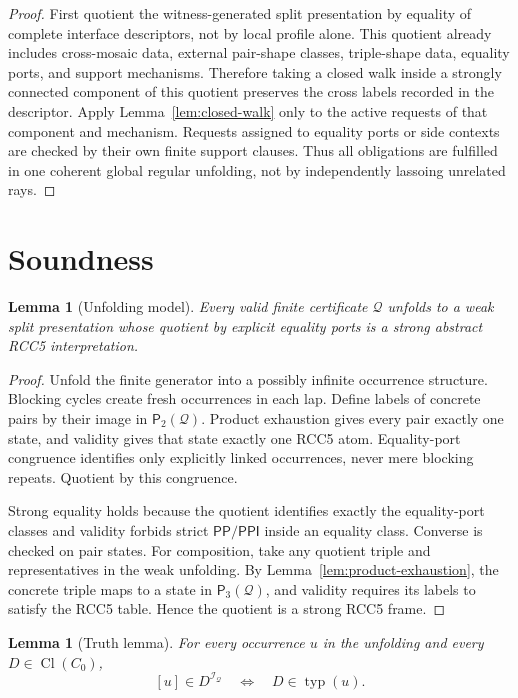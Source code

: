 \documentclass[11pt]{article}
\newtheorem{lemma}[theorem]{Lemma}
\newcommand{\PP}{\mathsf{PP}}
\newcommand{\PPI}{\mathsf{PPI}}
\newcommand{\Cl}{\operatorname{Cl}}
\newcommand{\I}{\mathcal I}
\newcommand{\Q}{\mathcal Q}
\newcommand{\typ}{\operatorname{typ}}
\newcommand{\Pairs}{\mathsf P_2}
\newcommand{\Triples}{\mathsf P_3}
\begin{document}
\begin{proof}
First quotient the witness-generated split presentation by equality of complete interface descriptors, not by local profile alone.  This quotient already includes cross-mosaic data, external pair-shape classes, triple-shape data, equality ports, and support mechanisms.  Therefore taking a closed walk inside a strongly connected component of this quotient preserves the cross labels recorded in the descriptor.  Apply Lemma~\ref{lem:closed-walk} only to the active requests of that component and mechanism.  Requests assigned to equality ports or side contexts are checked by their own finite support clauses.  Thus all obligations are fulfilled in one coherent global regular unfolding, not by independently lassoing unrelated rays.
\end{proof}

\section{Soundness}

\begin{lemma}[Unfolding model]
\label{lem:unfolding}
Every valid finite certificate $\Q$ unfolds to a weak split presentation whose quotient by explicit equality ports is a strong abstract RCC5 interpretation.
\end{lemma}

\begin{proof}
Unfold the finite generator into a possibly infinite occurrence structure.  Blocking cycles create fresh occurrences in each lap.  Define labels of concrete pairs by their image in $\Pairs(\Q)$.  Product exhaustion gives every pair exactly one state, and validity gives that state exactly one RCC5 atom.  Equality-port congruence identifies only explicitly linked occurrences, never mere blocking repeats.  Quotient by this congruence.

Strong equality holds because the quotient identifies exactly the equality-port classes and validity forbids strict $\PP/\PPI$ inside an equality class.  Converse is checked on pair states.  For composition, take any quotient triple and representatives in the weak unfolding.  By Lemma~\ref{lem:product-exhaustion}, the concrete triple maps to a state in $\Triples(\Q)$, and validity requires its labels to satisfy the RCC5 table.  Hence the quotient is a strong RCC5 frame.
\end{proof}

\begin{lemma}[Truth lemma]
\label{lem:truth}
For every occurrence $u$ in the unfolding and every $D\in\Cl(C_0)$,
\[
   [u]\in D^{\I_\Q}
   \quad\Longleftrightarrow\quad
   D\in\typ(u).
\]
\end{lemma}
\end{document}
